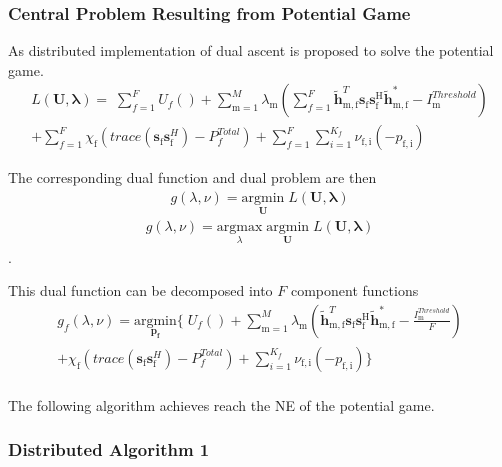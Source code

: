 \documentclass[12pt,a4paper]{report}
\begin{document}
\subsubsection{Central Problem Resulting from Potential Game}
As distributed implementation of dual ascent \cite[p.~8,9]{boyd2011distributed} is proposed to solve the potential game. 
\\
\begin{multline}
L(\mathbf{U,\lambda}) = 
\;
\sum_{f=1}^F U_f() 
+
\sum_{\mathrm{m=1}}^M \lambda_{\mathrm{m}}
(	  \sum^F_{f=1} \mathbf{\tilde{h}}_{\mathrm{m,f}}^T  \mathbf{s}_{\mathrm{f}} 						
	\mathbf{s_{\mathrm{f}}^{\mathrm{H}}} \mathbf{\tilde{h}_{\mathrm{m,f}}^*} - I^{Threshold}		
	_{\mathrm{m}} )
\\
+ 
\sum_{f=1}^F
\chi_{\mathrm{f}}(trace(\mathbf{s}_\mathrm{f}\mathbf{s}_\mathrm{f}^H)-P^{Total}_{f} )
+
\sum_{f=1}^F 
\sum_{i=1}^{K_f}
\nu_{\mathrm{f,i}}(-p_{\mathrm{f,i}})
\end{multline}

The corresponding dual function and dual problem are then 
\begin{gather*}
g(\lambda,\nu) = \underset{\mathbf{U}}{\mathrm{argmin}}\;L(\mathbf{U,\lambda})
\end{gather*}
\begin{gather*}
g(\lambda,\nu) = \underset{\lambda}{\mathrm{argmax}}\;\underset{\mathbf{U}}{\mathrm{argmin}}\;L(\mathbf{U,\lambda})
\end{gather*}
.



This dual function can be decomposed into $F$ component functions
\begin{multline}
g_f(\lambda,\nu) = \underset{\mathbf{p_f}}{\mathrm{argmin}}
\{
\;
U_f() 
+
\sum_{\mathrm{m=1}}^M \lambda_{\mathrm{m}}
(\mathbf{\tilde{h}}_{\mathrm{m,f}}^T  \mathbf{s}_{\mathrm{f}} 						
	\mathbf{s_{\mathrm{f}}^{\mathrm{H}}} \mathbf{\tilde{h}_{\mathrm{m,f}}^*} - \frac{I^{Threshold}_{\mathrm{m}}}{F})
\\
+ 
\chi_{\mathrm{f}}(trace(\mathbf{s}_\mathrm{f}\mathbf{s}_\mathrm{f}^H)-P^{Total}_{f} )
+
\sum_{i=1}^{K_f}
\nu_{\mathrm{f,i}}(-p_{\mathrm{f,i}})\}
\end{multline}
\\

The following algorithm achieves reach the NE of the potential game. 
\subsubsection{Distributed Algorithm 1}\label{algo1}
\end{document}
